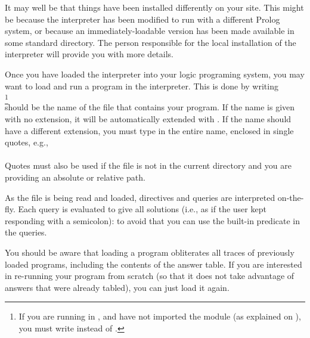 It may well be that things have been installed differently on your site.
This might be because the interpreter has been modified to run with a
different Prolog system, or because an immediately-loadable version has been
made available in some standard directory. The person responsible for the
local installation of the interpreter will provide you with more details.


%

Once you have loaded the interpreter into your logic programing system, you
may want to load and run a program in the interpreter. This is done by
writing\\
\ind{}%
\footnote{
  If you are running in \Eclipse{}, and have not imported the module 
  (as explained on ), you must write 
  instead of .
}\\
 should be the name of the file that contains your program.
If the name is given with no extension, it will be automatically extended
with .%
%
If the name should have a different extension, you must type in the entire
name, enclosed in single quotes, e.g.,\\
\ind{}\\
Quotes must also be used if the file is not in the current directory and you
are providing an absolute or relative path.

As the file is being read and loaded, directives and queries are interpreted
on-the-fly. Each query is evaluated to give all solutions (i.e., as if the
user kept responding with a semicolon): to avoid that you can use the
built-in predicate  in the queries.

You should be aware that loading a program obliterates all traces of
previously loaded programs, including the contents of the answer table.  If
you are interested in re-running your program from scratch (so that it does
not take advantage of answers that were already tabled), you can just load it
again.




